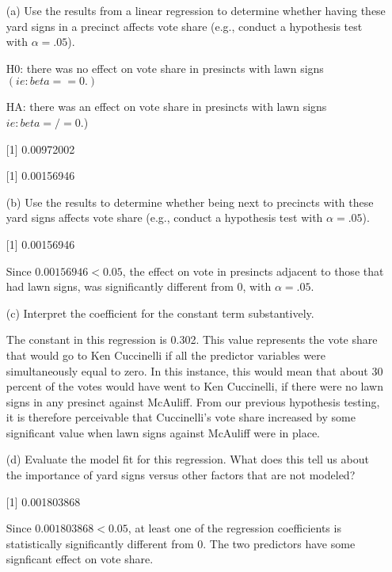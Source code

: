 \documentclass[12pt,letterpaper]{article}
\begin{document}
\vspace{.2cm}
\begin{enumerate}
	\item [(a)] Use the results from a linear regression to determine whether having these yard signs in a precinct affects vote share (e.g., conduct a hypothesis test with $\alpha = .05$).
	
	H0: there was no effect on vote share in presincts with lawn signs \((ie: beta == 0.)\)
	
	
	HA: there was an effect on vote share in presincts with lawn signs \(ie: beta =/= 0.\))
		 
		[1] 0.00972002
	 
	[1] 0.00156946
	\newpage		
	\item [(b)]  Use the results to determine whether being
	next to precincts with these yard signs affects vote
	share (e.g., conduct a hypothesis test with $\alpha = .05$).
	
	 
	[1] 0.00156946
	
	Since  \(0.00156946 < 0.05\), the effect on vote in presincts adjacent to those that had lawn signs, was significantly different from 0, with $\alpha = .05$.
	
	\vspace{1cm}
	\item [(c)] Interpret the coefficient for the constant term substantively.
	
	 The constant in this regression is 0.302. This value represents the vote share that would go to Ken Cuccinelli if all the predictor variables were simultaneously equal to zero. In this instance, this would mean that about 30 percent of the votes would have went to Ken Cuccinelli, if there were no lawn signs in any presinct against McAuliff. From our previous hypothesis testing, it is therefore perceivable that Cuccinelli's vote share increased by some significant value when lawn signs against McAuliff were in place. 
	\vspace{1cm}
	
	\item [(d)] Evaluate the model fit for this regression.  What does this	tell us about the importance of yard signs versus other factors that are not modeled?
		 
	[1] 0.001803868
	
	Since  \(0.001803868 < 0.05\), at least one of the regression coefficients is statistically significantly different from 0. The two predictors have some signficant effect on vote share. 
\end{enumerate}  
\end{document}
